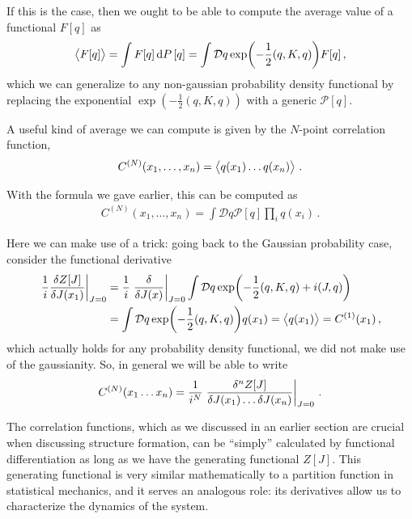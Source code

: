 \documentclass[main.tex]{subfiles}
\begin{document}
If this is the case, then we ought to be able to compute the average value of a functional \(F[q]\) as 
%
\begin{align} \label{eq:average-of-a-functional}
\expval{F[q]} = \int F[q] \dd{P}[q] = \int \mathcal{D}q \exp(- \frac{1}{2} (q, K, q)) F[q]  
\,,
\end{align}
%
which we can generalize to any non-gaussian probability density functional by replacing the exponential \(\exp(- \frac{1}{2} (q, K, q))\) with a generic \(\mathcal{P}[q]\).

A useful kind of average we can compute is given by the \(N\)-point correlation function, 
%
\begin{align}
C^{(N)}(x_1, \dots, x_n) = \expval{q(x_1) \dots q(x_n)}
\,.
\end{align}

With the formula we gave earlier, this can be computed as 
%
\begin{align}
C^{(N)}(x_1, \dots , x_n)
= \int \mathcal{D}q \mathcal{P}[q] \prod_i q(x_i)
\,.
\end{align}

Here we can make use of a trick: going back to the Gaussian probability case, consider the functional derivative
%
\begin{align}
\eval{\frac{1}{i}\fdv{Z[J]}{J(x_1 )}}_{J = 0} &= \frac{1}{i} \eval{\fdv{}{J(x)}}_{J=0} \int \mathcal{D}q
\exp(- \frac{1}{2} (q, K, q) + i (J,q))  \\
&= \int \mathcal{D}q \exp(- \frac{1}{2} (q, K, q)) q(x_1 )
= \expval{q(x_1 )} = C^{(1)}(x_1 )
\,,
\end{align}
%
which actually holds for any probability density functional, we did not make use of the gaussianity.
So, in general we will be able to write 
%
\begin{align}
C^{(N)} (x_1 \dots x_n) = \frac{1}{i^{N}} \eval{\frac{ \delta^{n} Z[J]}{ \delta J(x_1 )\dots \delta J(x_n)}}_{J =0 }
\,.
\end{align}

The correlation functions, which as we discussed in an earlier section are crucial when discussing structure formation, can be ``simply'' calculated by functional differentiation as long as we have the generating functional \(Z[J]\).
This generating functional is very similar mathematically to a partition function in statistical mechanics, and it serves an analogous role: its derivatives allow us to characterize the dynamics of the system. 
\end{document}
